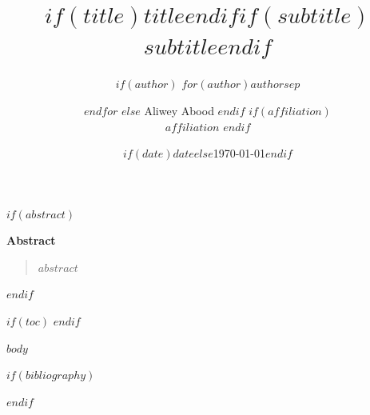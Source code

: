 \documentclass[11pt,a4paper]{article}
\title{$if(title)$\textbf{$title$}$endif$$if(subtitle)$\\[0.4em]\large $subtitle$$endif$}
\author{%
$if(author)$
  $for(author)$$author$$sep$ \and $endfor$
$else$
  Aliwey Abood
$endif$
$if(affiliation)$
  \\[0.3em]\small\itshape $affiliation$
$endif$
}
\date{$if(date)$$date$$else$\today$endif$}
\theoremstyle{plain}
\theoremstyle{definition}
\theoremstyle{remark}
\renewenvironment{abstract}{%
  \begin{center}\textbf{\large Abstract}\end{center}%
  \begin{quotation}\noindent\small\ignorespaces
}{%
  \end{quotation}\vspace{1em}
}
\begin{document}
\maketitle
\thispagestyle{plain}

$if(abstract)$
\begin{abstract}
$abstract$
\end{abstract}
$endif$

$if(toc)$
{\hypersetup{linkcolor=black}
\setcounter{tocdepth}{$toc-depth$}
\tableofcontents
}
\vspace{1em}
$endif$

$body$

$if(bibliography)$


$endif$
\end{document}
